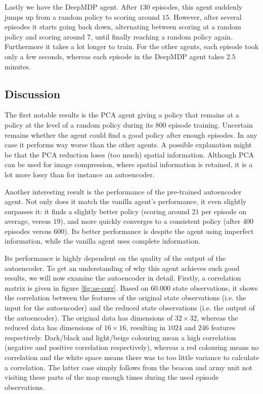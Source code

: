 Lastly we have the DeepMDP agent. After $130$ episodes, this agent suddenly jumps up from a random policy to scoring around $15$. However, after several episodes it starts going back down, alternating between scoring at a random policy and scoring around $7$, until finally reaching a random policy again. Furthermore it takes a lot longer to train. For the other agents, each episode took only a few seconds, whereas each episode in the DeepMDP agent takes $2.5$ minutes.

\subsection{Discussion}\label{research-discussion}
The first notable results is the PCA agent giving a policy that remains at a policy at the level of a random policy during its $800$ episode training.  Uncertain remains whether the agent could find a good policy after enough episodes. In any case it performs way worse than the other agents. A possible explanation might be that the PCA reduction loses (too much) spatial information. Although PCA can be used for image compression, where spatial information is retained, it is a lot more lossy than for instance an autoencoder.

Another interesting result is the performance of the pre-trained autoencoder agent. Not only does it match the vanilla agent's performance, it even slightly surpasses it: it finds a slightly better policy (scoring around $21$ per episode on average, versus $19$), and more quickly converges to a consistent policy (after $400$ episodes versus $600$). Its better performance is despite the agent using imperfect information, while the vanilla agent uses complete information.

Its performance is highly dependent on the quality of the output of the autoencoder. To get an understanding of why this agent achieves such good results, we will now examine the autoencoder in detail. Firstly, a correlation matrix is given in figure \ref{fig:ae-corr}. Based on $60.000$ state observations, it shows the correlation between the features of the original state observations (i.e. the input for the autoencoder) and the reduced state observations (i.e. the output of the autoencoder). The original data has dimensions of $32 \times 32$, whereas the reduced data has dimensions of $16 \times 16$, resulting in $1024$ and $246$ features respectively. Dark/black and light/beige colouring mean a high correlation (negative and positive correlation respectively), whereas a red colouring means no correlation and the white space means there was to too little variance to calculate a correlation. The latter case simply follows from the beacon and army unit not visiting these parts of the map enough times during the used episode observations.

